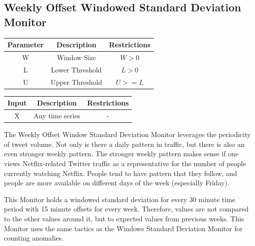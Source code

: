 \documentclass[12pt]{ucthesis}
\begin{document}
\subsection{Weekly Offset Windowed Standard Deviation Monitor}
\label{outage-detection-monitors-WeeklyWindowStdDev}
\begin{table}[H]
   \begin{center}
      \begin{tabular}{|c|c|c|}
         \hline
            Parameter & Description & Restrictions \\
         \hline
            W & Window Size & $ W > 0 $\\
         \hline
            L & Lower Threshold & $L > 0 $\\
         \hline
            U & Upper Threshold & $U >= L $\\
         \hline
      \end{tabular}
   \end{center}
\end{table}

\begin{table}[H]
   \begin{center}
      \begin{tabular}{|c|c|c|}
         \hline
            Input & Description & Restrictions \\
         \hline
            X & Any time series & - \\
         \hline
      \end{tabular}
   \end{center}
\end{table}

The Weekly Offset Window Standard Deviation Monitor leverages the periodicity of tweet volume.
Not only is there a daily pattern in traffic, but there is also an even stronger weekly pattern.
The stronger weekly pattern makes sense if one views Netflix-related Twitter traffic as a representative for the number of
people currently watching Netflix. People tend to have pattern that they follow, and people are more available
on different days of the week (especially Friday).

This Monitor holds a windowed standard deviation for every 30 minute time period with 15 minute offsets
for every week. Therefore, values are not compared to the other values around it, but to expected values from
previous weeks. This Monitor uses the same tactics as the Windows Standard Deviation Monitor for counting anomalies.
\end{document}
